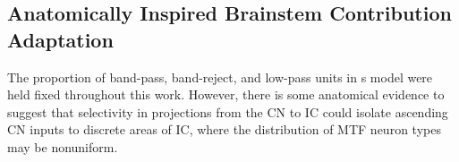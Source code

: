 \subsection{Anatomically Inspired Brainstem Contribution Adaptation} %
\label{sub:anatomically_inspired_brainstem_adaptation}
The proportion of band-pass, band-reject, and low-pass units in \citeauthor{Carney2015Speech}s model were held fixed throughout this work.  However, there is some anatomical evidence to suggest that selectivity in projections from the CN to IC could isolate ascending CN inputs to discrete areas of IC, where the distribution of MTF neuron types may be nonuniform.
